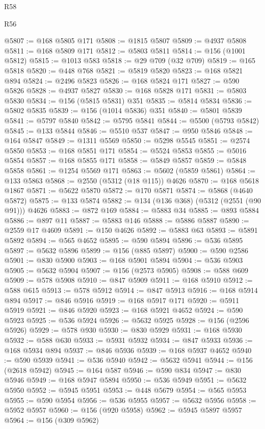 \begin{lexlean}{R58}
\begin{lexlean}{R56}
\begin{coremodule}
{{{{{{{{{{{{{{{{{{{{{{{{{{{{{{{{{{{{{{{{{{{{{{{{{{{{{{{{{{{{{{{{{{{{{{{{{{{{{{{{{{{{{{{{{{{{{{{{{{{{{{{{{{{{{{{{{{{{{{{{{{{{{{{{{{{{{{{{{{{{{{{{{{{{{{{{{{{{{{{{{{{{{{{{{{{{{{{{{{{{{{{{{{{{{{{{{{{{{{{{{{{{{{{{{{{@5807 := @168 @5805 @171
@5808 := @1815 @5807
@5809 := @4937 @5808
@5811 := @168 @5809 @171
@5812 := @5803 @5811
@5814 := @156 (@1001 @5812)
@5815 := @1013 @583
@5818 := @29 @709 (@32 @709)
@5819 := @165 @5818
@5820 := @448 @768
@5821 := @5819 @5820
@5823 := @168 @5821 @894
@5824 := @2496 @5823
@5826 := @168 @5824 @171
@5827 := @590 @5826
@5828 := @4937 @5827
@5830 := @168 @5828 @171
@5831 := @5803 @5830
@5834 := @156 (@5815 @5831) @351
@5835 := @5814 @5834
@5836 := @5802 @5835
@5839 := @156 (@1014 @5836) @351
@5840 := @5801 @5839
@5841 := @5797 @5840
@5842 := @5795 @5841
@5844 := @5500 (@5793 @5842)
@5845 := @133 @5844
@5846 := @5510 @537
@5847 := @950 @5846
@5848 := @164 @5847
@5849 := @1311 @5569
@5850 := @5298 @5545
@5851 := @2574 @5850
@5853 := @168 @5851 @171
@5854 := @5524 @5853
@5855 := @5016 @5854
@5857 := @168 @5855 @171
@5858 := @5849 @5857
@5859 := @5848 @5858
@5861 := @1254 @5569 @171
@5863 := @5602 (@5859 @5861)
@5864 := @133 @5863
@5868 := @2550 (@5312 (@18 @115)) @4626
@5870 := @168 @5618 @1867
@5871 := @5622 @5870
@5872 := @170 @5871
@5874 := @5868 (@4640 @5872)
@5875 := @133 @5874
@5882 := @134 (@136 @368) (@5312 (@2551 (@90 @91))) @4626
@5883 := @872 @169
@5884 := @5883 @34
@5885 := @893 @5884
@5886 := @897 @11
@5887 := @5883 @146
@5888 := @5886 @5887
@5890 := @2559 @17 @4609
@5891 := @150 @4626
@5892 := @5883 @63
@5893 := @5891 @5892
@5894 := @565 @4652
@5895 := @590 @5894
@5896 := @536 @5895
@5897 := @5632 @5896
@5899 := @156 (@885 @5897)
@5900 := @590 @2586
@5901 := @830 @5900
@5903 := @168 @5901 @5894
@5904 := @536 @5903
@5905 := @5632 @5904
@5907 := @156 (@2573 @5905)
@5908 := @588 @609
@5909 := @578 @5908
@5910 := @847 @5909
@5911 := @168 @5910
@5912 := @588 @615
@5913 := @578 @5912
@5914 := @847 @5913
@5916 := @168 @5914 @894
@5917 := @846 @5916
@5919 := @168 @5917 @171
@5920 := @5911 @5919
@5921 := @846 @5920
@5923 := @168 @5921 @4652
@5924 := @590 @5923
@5925 := @536 @5924
@5926 := @5632 @5925
@5928 := @156 (@2596 @5926)
@5929 := @578 @930
@5930 := @830 @5929
@5931 := @168 @5930
@5932 := @588 @630
@5933 := @5931 @5932
@5934 := @847 @5933
@5936 := @168 @5934 @894
@5937 := @846 @5936
@5939 := @168 @5937 @4652
@5940 := @590 @5939
@5941 := @536 @5940
@5942 := @5632 @5941
@5944 := @156 (@2618 @5942)
@5945 := @164 @587
@5946 := @590 @834
@5947 := @830 @5946
@5949 := @168 @5947 @5894
@5950 := @536 @5949
@5951 := @5632 @5950
@5952 := @5945 @5951
@5953 := @448 @5679
@5954 := @565 @5953
@5955 := @590 @5954
@5956 := @536 @5955
@5957 := @5632 @5956
@5958 := @5952 @5957
@5960 := @156 (@920 @5958)
@5962 := @5945 @5897 @5957
@5964 := @156 (@309 @5962)
}}}}}}}}}}}}}}}}}}}}}}}}}}}}}}}}}}}}}}}}}}}}}}}}}}}}}}}}}}}}}}}}}}}}}}}}}}}}}}}}}}}}}}}}}}}}}}}}}}}}}}}}}}}}}}}}}}}}}}}}}}}}}}}}}}}}}}}}}}}}}}}}}}}}}}}}}}}}}}}}}}}}}}}}}}}}}}}}}}}}}}}}}}}}}}}}}}}}}}}}}}}}}}}}}}}
\end{coremodule}
\end{lexlean}
\end{lexlean}
